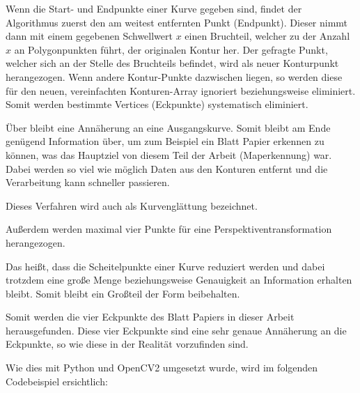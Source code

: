 Wenn die Start- und Endpunkte einer Kurve gegeben sind, findet der Algorithmus zuerst den am weitest entfernten Punkt (Endpunkt). Dieser nimmt dann mit einem gegebenen Schwellwert \(x\) einen Bruchteil, welcher zu der Anzahl \(x\) an Polygonpunkten führt, der originalen Kontur her. Der gefragte Punkt, welcher sich an der Stelle des Bruchteils befindet, wird als neuer Konturpunkt herangezogen. Wenn andere Kontur-Punkte dazwischen liegen, so werden diese für den neuen, vereinfachten Konturen-Array ignoriert beziehungsweise eliminiert. Somit werden bestimmte Vertices (Eckpunkte) systematisch eliminiert.

Über bleibt eine Annäherung an eine Ausgangskurve. Somit bleibt am Ende genügend Information über, um zum Beispiel ein Blatt Papier erkennen zu können, was das Hauptziel von diesem Teil der Arbeit (Maperkennung) war. Dabei werden so viel wie möglich Daten aus den Konturen entfernt und die Verarbeitung kann schneller passieren.

Dieses Verfahren wird auch als Kurvenglättung bezeichnet.

Außerdem werden maximal vier Punkte für eine Perspektiventransformation herangezogen.

Das heißt, dass die Scheitelpunkte einer Kurve reduziert werden und dabei trotzdem eine große Menge beziehungsweise Genauigkeit an Information erhalten bleibt. Somit bleibt ein Großteil der Form beibehalten.

Somit werden die vier Eckpunkte des Blatt Papiers in dieser Arbeit herausgefunden. Diese vier Eckpunkte sind eine sehr genaue Annäherung an die Eckpunkte, so wie diese in der Realität vorzufinden sind.

Wie dies mit Python und OpenCV2 umgesetzt wurde, wird im folgenden Codebeispiel ersichtlich:


